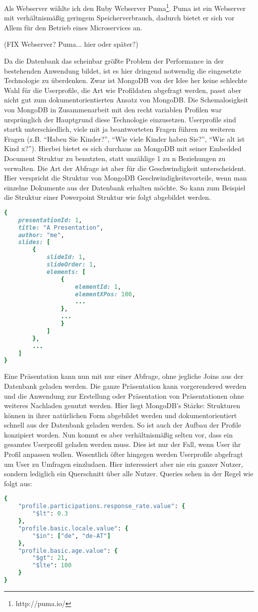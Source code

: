 Als Webserver wählte ich den Ruby Webserver Puma\footnote{http://puma.io/}. Puma ist ein Webserver mit verhältnismäßig geringem Speicherverbrauch, dadurch bietet er sich vor Allem für den Betrieb eines Microservices an.

(FIX Webserver? Puma... hier oder später?)

Da die Datenbank das scheinbar größte Problem der Performance in der bestehenden Anwendung bildet, ist es hier dringend notwendig die eingesetzte Technologie zu überdenken. Zwar ist MongoDB von der Idee her keine schlechte Wahl für die Userprofile, die Art wie Profildaten abgefragt werden, passt aber nicht gut zum dokumentorientierten Ansatz von MongoDB.
Die Schemalosigkeit von MongoDB in Zusammenarbeit mit den recht variablen Profilen war ursprünglich der Hauptgrund diese Technologie einzusetzen. Userprofile sind startk unterschiedlich, viele mit ja beantworteten Fragen führen zu weiteren Fragen (z.B. ``Haben Sie Kinder?'', ``Wie viele Kinder haben Sie?'', ``Wie alt ist Kind x?''). Hierbei bietet es sich durchaus an MongoDB mit seiner Embedded Document Struktur zu benutzten, statt unzählige 1 zu n Beziehungen zu verwalten. Die Art der Abfrage ist aber für die Geschwindigkeit unterscheident. Hier verspricht die Struktur von MongoDB Geschwindigkeitsvorteile, wenn man einzelne Dokumente aus der Datenbank erhalten möchte. So kann zum Beispiel die Struktur einer Powerpoint Struktur wie folgt abgebildet werden.
\begin{lstlisting}[language=Ruby]
{
    presentationId: 1,
    title: "A Presentation",
    author: "me",
    slides: [
        {
            slideId: 1,
            slideOrder: 1,
            elements: [
                {
                    elementId: 1,
                    elementXPos: 100,
                    ...
                },
                ...
                }
            ]
        },
        ...
    ]
}
\end{lstlisting}
Eine Präsentation kann nun mit nur einer Abfrage, ohne jegliche Joins aus der Datenbank geladen werden. Die ganze Präsentation kann vorgerendered werden und die Anwendung zur Erstellung oder Präsentation von Präsentationen ohne weiteres Nachladen genutzt werden. Hier liegt MongoDB's Stärke: Strukturen können in ihrer natürlichen Form abgebildet werden und dokumentorientiert schnell aus der Datenbank geladen werden.
So ist auch der Aufbau der Profile konzipiert worden. Nun kommt es aber verhältnismäßig selten vor, dass ein gesamtes Userprofil geladen werden muss. Dies ist nur der Fall, wenn User ihr Profil anpassen wollen.
Wesentlich öfter hingegen werden Userprofile abgefragt um User zu Umfragen einzludaen. Hier interessiert aber nie ein ganzer Nutzer, sondern lediglich ein Querschnitt über alle Nutzer. Queries sehen in der Regel wie folgt aus:
\begin{lstlisting}[language=Ruby]
{
    "profile.participations.response_rate.value": {
        "$lt": 0.3
    },
    "profile.basic.locale.value": {
        "$in": ["de", "de-AT"]
    },
    "profile.basic.age.value": {
        "$gt": 21,
        "$lte": 100
    }
}
\end{lstlisting}

